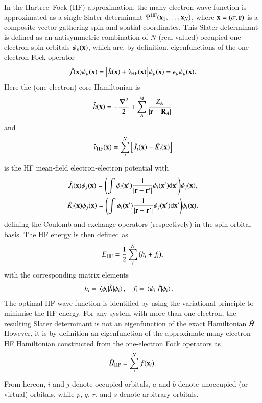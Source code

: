 \documentclass[aps,prb,reprint,noshowkeys,superscriptaddress]{revtex4-1}
\newcommand{\Ne}{N} %
\newcommand{\hH}{\Hat{H}}
\begin{document}
In the Hartree--Fock (HF) approximation, the many-electron wave function is approximated as a single Slater determinant $\Psi^{\text{HF}}(\vb{x}_1,\ldots,\vb{x}_N)$, where $\vb{x} = (\sigma,\vb{r})$ is a composite vector gathering spin and spatial coordinates.
This Slater determinant is defined as an antisymmetric combination of $\Ne$ (real-valued) occupied one-electron spin-orbitals $\phi_p(\vb{x})$, which are, by definition, eigenfunctions of the one-electron Fock operator 
\begin{equation}\label{eq:FockOp}
    \Hat{f}(\vb{x}) \phi_p(\vb{x}) = \qty[ \Hat{h}(\vb{x}) + \Hat{v}_\text{HF}(\vb{x}) ] \phi_p(\vb{x}) = \epsilon_p \phi_p(\vb{x}).
\end{equation}
Here the (one-electron) core Hamiltonian is
\begin{equation}
\label{eq:Hcore}
	\Hat{h}(\vb{x}) = -\frac{\grad^2}{2} + \sum_{A}^{M} \frac{Z_A}{\abs{\vb{r}-\vb{R}_A}}
\end{equation}
and
\begin{equation}
    \Hat{v}_\text{HF}(\vb{x}) = \sum_i^{N} \qty[ \Hat{J}_i(\vb{x}) - \Hat{K}_i(\vb{x}) ]
\end{equation}
is the HF mean-field electron-electron potential with 
\begin{subequations}
\begin{gather}
	\label{eq:CoulOp}
    \Hat{J}_i(\vb{x})\phi_j(\vb{x})=\qty(\int \phi_i(\vb{x}')\frac{1}{\abs{\vb{r} - \vb{r}'}}\phi_i(\vb{x}') \dd\vb{x}' ) \phi_j(\vb{x}),
	\\
	\label{eq:ExcOp}
\Hat{K}_i(\vb{x})\phi_j(\vb{x})=\qty(\int \phi_i(\vb{x}')\frac{1}{\abs{\vb{r} - \vb{r}'}}\phi_j(\vb{x}') \dd\vb{x}')\phi_i(\vb{x}),
\end{gather}
\end{subequations}
defining the Coulomb and exchange operators (respectively) in the spin-orbital basis.\cite{SzaboBook}
The HF energy is then defined as 
\begin{equation}
    \label{eq:E_HF}
    E_\text{HF} = \frac{1}{2} \sum_i^{N} \qty( h_i + f_i ),
\end{equation}
with the corresponding matrix elements
\begin{align}
	h_i & = \mel{\phi_i}{\Hat{h}}{\phi_i},
    & 
    f_i & = \mel{\phi_i}{\Hat{f}}{\phi_i}.
\end{align}
The optimal HF wave function is identified by using the variational principle to minimise the HF energy.
For any system with more than one electron, the resulting Slater determinant is not an eigenfunction of the exact Hamiltonian $\hH$. 
However, it is by definition an eigenfunction of the approximate many-electron HF Hamiltonian constructed 
from the one-electron Fock operators as
\begin{equation}\label{eq:HFHamiltonian}
	\hH_{\text{HF}} = \sum_{i}^{N} f(\vb{x}_i).
\end{equation}
From hereon, $i$ and $j$ denote occupied orbitals, $a$ and $b$ denote unoccupied (or virtual) orbitals, while $p$, $q$, $r$, and $s$ denote arbitrary orbitals.
\end{document}
